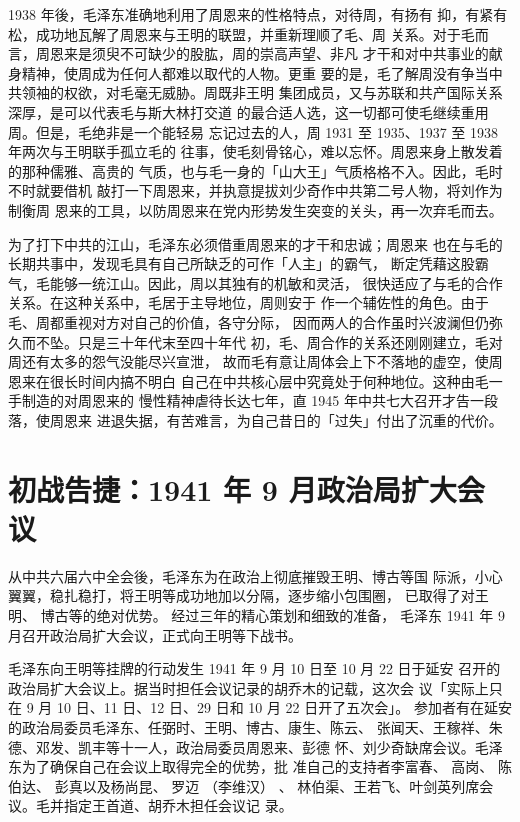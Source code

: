 1938 年後，毛泽东准确地利用了周恩来的性格特点，对待周，有扬有
抑，有紧有松，成功地瓦解了周恩来与王明的联盟，并重新理顺了毛、周
关系。对于毛而言，周恩来是须臾不可缺少的股肱，周的崇高声望、非凡
才干和对中共事业的献身精神，使周成为任何人都难以取代的人物。更重
要的是，毛了解周没有争当中共领袖的权欲，对毛毫无威胁。周既非王明
集团成员，又与苏联和共产国际关系深厚，是可以代表毛与斯大林打交道
的最合适人选，这一切都可使毛继续重用周。但是，毛绝非是一个能轻易
忘记过去的人，周 1931 至 1935、1937 至 1938 年两次与王明联手孤立毛的
往事，使毛刻骨铭心，难以忘怀。周恩来身上散发着的那种儒雅、高贵的
气质，也与毛一身的「山大王」气质格格不入。因此，毛时不时就要借机
敲打一下周恩来，并执意提拔刘少奇作中共第二号人物，将刘作为制衡周
恩来的工具，以防周恩来在党内形势发生突变的关头，再一次弃毛而去。

为了打下中共的江山，毛泽东必须借重周恩来的才干和忠诚；周恩来
也在与毛的长期共事中，发现毛具有自己所缺乏的可作「人主」的霸气，
断定凭藉这股霸气，毛能够一统江山。因此，周以其独有的机敏和灵活，
很快适应了与毛的合作关系。在这种关系中，毛居于主导地位，周则安于
作一个辅佐性的角色。由于毛、周都重视对方对自己的价值，各守分际，
因而两人的合作虽时兴波澜但仍弥久而不坠。只是三十年代末至四十年代
初，毛、周合作的关系还刚刚建立，毛对周还有太多的怨气没能尽兴宣泄，
故而毛有意让周体会上下不落地的虚空，使周恩来在很长时间内搞不明白
自己在中共核心层中究竟处于何种地位。这种由毛一手制造的对周恩来的
慢性精神虐待长达七年，直 1945 年中共七大召开才告一段落，使周恩来
进退失据，有苦难言，为自己昔日的「过失」付出了沉重的代价。
\section{
初战告捷：1941 年 9 月政治局扩大会议}
从中共六届六中全会後，毛泽东为在政治上彻底摧毁王明、博古等国
际派，小心翼翼，稳扎稳打，将王明等成功地加以分隔，逐步缩小包围圈，
已取得了对王明、
博古等的绝对优势。
经过三年的精心策划和细致的准备，
毛泽东 1941 年 9 月召开政治局扩大会议，正式向王明等下战书。

毛泽东向王明等挂牌的行动发生 1941 年 9 月 10 日至 10 月 22 日于延安
召开的政治局扩大会议上。据当时担任会议记录的胡乔木的记载，这次会
议「实际上只在 9 月 10 日、11 日、12 日、29 日和 10 月 22 日开了五次会」。
参加者有在延安的政治局委员毛泽东、任弼时、王明、博古、康生、陈云、
张闻天、王稼祥、朱德、邓发、凯丰等十一人，政治局委员周恩来、彭德
怀、刘少奇缺席会议。毛泽东为了确保自己在会议上取得完全的优势，批
准自己的支持者李富春、
高岗、
陈伯达、
彭真以及杨尚昆、
罗迈
（李维汉）
、
林伯渠、王若飞、叶剑英列席会议。毛并指定王首道、胡乔木担任会议记
录。

